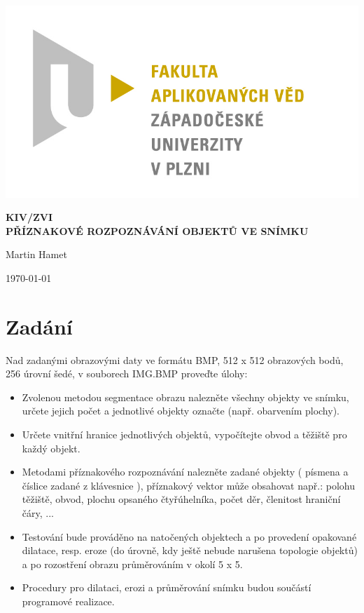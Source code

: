 \documentclass[12pt]{article}
\begin{document}
\begin{titlepage}
\includegraphics[scale=0.2, trim=5cm 0 0 30cm]{logo.jpg}
\begin{center}
\vspace{5cm}
{\Huge
\textbf{KIV/ZVI}\\
\vspace{1cm}
}
{\Large
\textbf{PŘÍZNAKOVÉ ROZPOZNÁVÁNÍ OBJEKTŮ VE SNÍMKU}
}
\end{center}
\vspace{\fill}

\begin{minipage}[t]{5cm}
\flushleft
Martin Hamet\\
\end{minipage}
\hfill
\begin{minipage}[t]{7cm}
\flushright
\today
\end{minipage}
\end{titlepage}

\tableofcontents
\newpage
\section{Zadání}
\label{zadani}
Nad zadanými obrazovými daty ve formátu BMP, 512 x 512 obrazových bodů, 256 úrovní šedé,
v souborech IMG.BMP proveďte úlohy:

\begin{itemize}
\renewcommand\labelitemi{--}
\setlength\itemsep{1px}
\item Zvolenou metodou segmentace obrazu nalezněte všechny objekty ve snímku, určete jejich počet
a jednotlivé objekty označte (např. obarvením plochy).
\item Určete vnitřní hranice jednotlivých objektů, vypočítejte obvod a těžiště pro každý objekt.
\item Metodami příznakového rozpoznávání nalezněte zadané objekty ( písmena a číslice zadané z klávesnice ), příznakový vektor může obsahovat např.: polohu těžiště, obvod, plochu opsaného
čtyřúhelníka, počet děr, členitost hraniční čáry, ...
\item Testování bude prováděno na natočených objektech a po provedení opakované dilatace, resp. eroze (do úrovně, kdy ještě nebude narušena topologie objektů) a po rozostření obrazu průměrováním v okolí 5 x 5.
\item Procedury pro dilataci, erozi a průměrování snímku budou součástí programové realizace.
\end{itemize}
\end{document}
